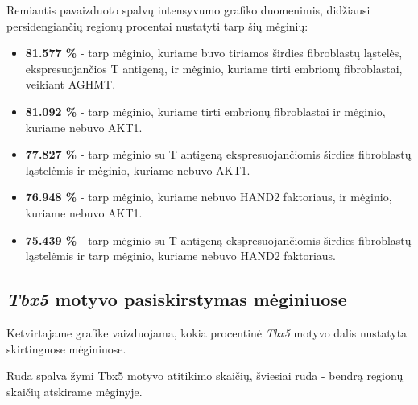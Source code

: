 \documentclass[12pt]{article}
\begin{document}
Remiantis pavaizduoto spalvų intensyvumo grafiko duomenimis,
didžiausi persidengiančių regionų procentai nustatyti tarp
šių mėginių:
\begin{itemize}
    \item \textbf{81.577 \%} - tarp mėginio, kuriame buvo tiriamos širdies
            fibroblastų ląstelės, ekspresuojančios T antigeną, ir mėginio,
            kuriame tirti embrionų fibroblastai, veikiant AGHMT.
    \item \textbf{81.092 \%} - tarp mėginio, kuriame tirti embrionų
            fibroblastai ir mėginio, kuriame nebuvo AKT1.
    \item \textbf{77.827 \%} - tarp mėginio su T antigeną ekspresuojančiomis
            širdies fibroblastų ląstelėmis ir mėginio, kuriame nebuvo AKT1.
    \item \textbf{76.948 \%} - tarp mėginio, kuriame nebuvo HAND2
            faktoriaus, ir mėginio, kuriame nebuvo AKT1.
    \item \textbf{75.439 \%} - tarp mėginio su T antigeną ekspresuojančiomis
            širdies fibroblastų ląstelėmis ir tarp mėginio, kuriame nebuvo HAND2
            faktoriaus.
  \end{itemize}

\subsection{\emph{Tbx5} motyvo pasiskirstymas mėginiuose}
Ketvirtajame grafike vaizduojama, kokia procentinė \emph{Tbx5}
motyvo dalis nustatyta skirtinguose mėginiuose.

Ruda spalva žymi Tbx5 motyvo atitikimo skaičių, šviesiai ruda -
bendrą regionų skaičių atskirame mėginyje.
\end{document}
